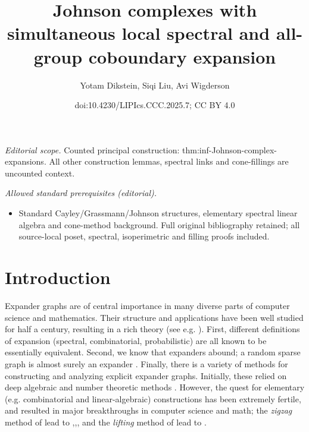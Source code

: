 \documentclass[10pt,a4paper]{article}
\title{Johnson complexes with simultaneous local spectral and all-group coboundary expansion}
\author{Yotam Dikstein, Siqi Liu, Avi Wigderson}
\date{doi:10.4230/LIPIcs.CCC.2025.7; CC BY 4.0}
\theoremstyle{definition}
\theoremstyle{remark}
\numberwithin{equation}{section}
\begin{document}
\maketitle
\noindent\textit{Editorial scope.} Counted principal construction: thm:inf-Johnson-complex-expansions. All other construction lemmas, spectral links and cone-fillings are uncounted context.\par\medskip
\noindent\textit{Allowed standard prerequisites (editorial).}\begin{itemize}
\item Standard Cayley/Grassmann/Johnson structures, elementary spectral linear algebra and cone-method background. Full original bibliography retained; all source-local poset, spectral, isoperimetric and filling proofs included.
\end{itemize}\medskip
{}
\setcounter{page}{1}
\section{Introduction}
Expander graphs are of central importance in many diverse parts of computer science and mathematics. Their structure and applications have been well studied for half a century, resulting in a rich theory (see e.g. \cite{hoory2006expander,lubotzky2012expander}). First, different definitions of expansion (spectral, combinatorial, probabilistic) are all known to be essentially equivalent. Second, we know that expanders abound; a random sparse graph is almost surely an expander \cite{pinsker1973complexity}. Finally, there is a variety of methods for constructing and analyzing explicit expander graphs. Initially, these relied on deep algebraic and number theoretic methods \cite{margulis1973explicit,gabber1981explicit,lubotzky1988ramanujan}. However, the quest for elementary (e.g. combinatorial and linear-algebraic) constructions has been extremely fertile, and resulted in major breakthroughs in computer science and math; the \emph{zigzag} method of \cite{reingold2000entropy} lead to \cite{dinur2007pcp},\cite{Reingold2008},\cite{TaShma2017explicit}, and the \emph{lifting} method of \cite{bilu2004constructing} lead to \cite{marcus2015interlacing,MarkusSS2015}.
\end{document}
